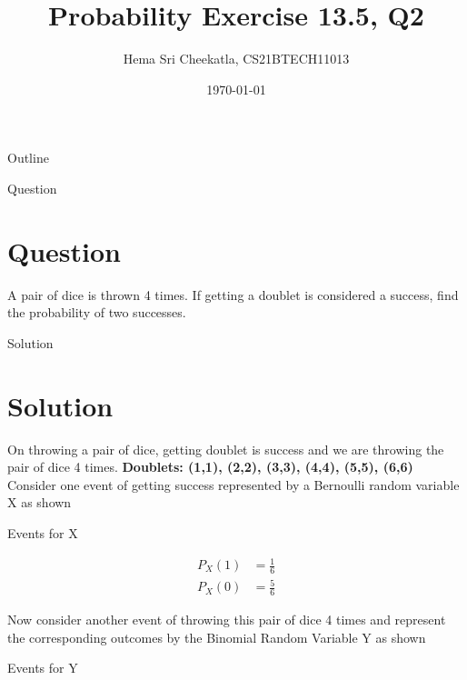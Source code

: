 \documentclass{beamer}
\title{Probability Exercise 13.5, Q2}
\author{Hema Sri Cheekatla, CS21BTECH11013}
\date{\today}
\theoremstyle{remark}
\numberwithin{equation}{subsection}
\begin{document}
\begin{frame}
    \titlepage 
\end{frame}

\logo{}


\begin{frame}{Outline}
    \tableofcontents
\end{frame}

\begin{frame}{Question}
\section{Question}
	A pair of dice is thrown 4 times. If getting a doublet is considered a success, find
the probability of two successes.
\end{frame}

\begin{frame}{Solution}
\section{Solution}
On throwing a pair of dice, getting doublet is success and we are throwing the pair of dice 4 times. \newline
\textbf{Doublets: (1,1), (2,2), (3,3), (4,4), (5,5), (6,6)} \newline
Consider one event of getting success represented by a Bernoulli random variable X as shown 
\begin{table}[h]
	\caption{Events for X}
	\label{tab:mesh}
	
\end{table}
\end{frame}

\begin{frame}
\begin{align}
	P_X(1) &= \frac{1}{6} \\
	P_X(0) &= \frac{5}{6} 
\end{align}
\end{frame}

\begin{frame}{}
Now consider another event of throwing this pair of dice 4 times and represent the corresponding outcomes by the Binomial Random Variable Y as shown
\begin{table}[h]
	\caption{Events for Y}
	\label{tab:mesh}
	
\end{table}
\end{frame}
\end{document}
